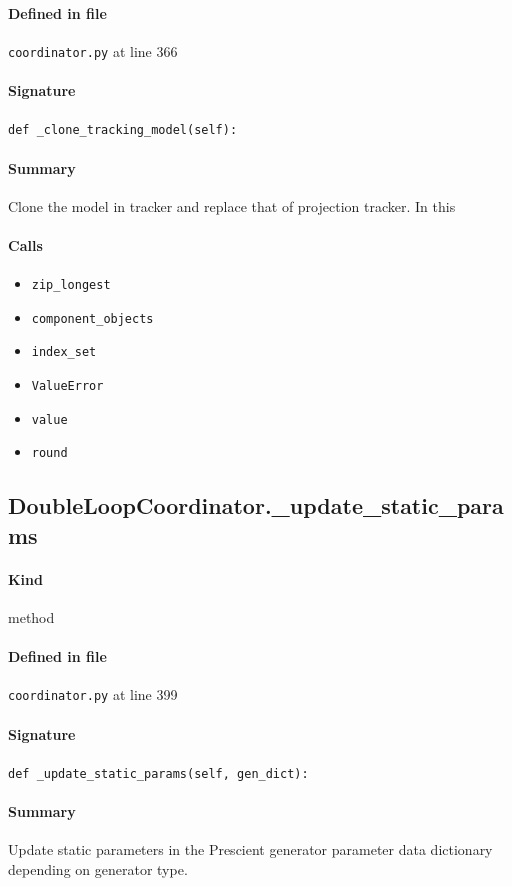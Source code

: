 \documentclass[11pt]{report}
\begin{document}
\paragraph{Defined in file} \texttt{coordinator.py} at line 366
\paragraph{Signature} \texttt{def \_clone\_tracking\_model(self):}
\paragraph{Summary} Clone the model in tracker and replace that of projection tracker. In this
\paragraph{Calls}
\begin{itemize}[leftmargin=*]
  \item \texttt{zip\_longest}
  \item \texttt{component\_objects}
  \item \texttt{index\_set}
  \item \texttt{ValueError}
  \item \texttt{value}
  \item \texttt{round}
\end{itemize}
\subsection{DoubleLoopCoordinator.\_update\_static\_params}
\label{def:coordinator.py:DoubleLoopCoordinator._update_static_params:L399}
\paragraph{Kind} method
\paragraph{Defined in file} \texttt{coordinator.py} at line 399
\paragraph{Signature} \texttt{def \_update\_static\_params(self, gen\_dict):}
\paragraph{Summary} Update static parameters in the Prescient generator parameter data dictionary depending on generator type.
\end{document}
